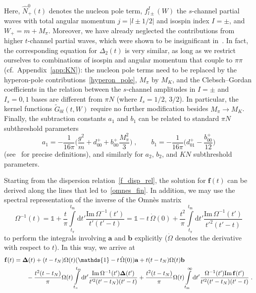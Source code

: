 \documentclass[11pt]{article}%
\providecommand{\ec}{\;,}
\providecommand{\ep}{\;.}
\providecommand{\nt}{\notag}
\newcommand{\diff}{\text{d}}
\newcommand{\mpi}{M_{\pi}}
\newcommand{\mK}{M_K}
\newcommand{\unity}{\mathds{1}}
\newcommand{\tpi}{t_\pi}
\newcommand{\tN}{t_N}
\newcommand{\tm}{t_\text{m}}
\newcommand{\ff}{\mathbf{f}}
\newcommand{\beq}{\begin{equation}}
\newcommand{\eeq}{\end{equation}}
\renewcommand{\Im}{\text{Im}\,}
\providecommand{\unity}{\mathds{1}}
\begin{document}
Here, $\hat N^0_+(t)$ denotes the nucleon pole term, $f^I_{l\pm}(W)$ the $s$-channel partial waves with total angular momentum $j=|l\pm 1/2|$ and isospin index $I=\pm$, and $W_+=m+\mpi$. Moreover, we have already neglected the contributions from higher $t$-channel partial waves, which were shown to be insignificant in~\cite{RS_DHKM}. In fact, the corresponding equation for $\Delta_2(t)$ is very similar, as long as we restrict ourselves to combinations of isospin and angular momentum that couple to $\pi\pi$ (cf.\ Appendix~\ref{app:KN}): the nucleon pole terms need to be replaced by the hyperon-pole contributions~\eqref{hyperon_pole}, $\mpi$ by $\mK$, and the Clebsch--Gordan coefficients in the relation between the $s$-channel amplitudes in $I=\pm$ and $I_s=0,1$ bases are different from $\pi N$ (where $I_s=1/2,\,3/2$). In particular, the kernel functions $\tilde G_{0l}(t,W)$ require no further modification besides $\mpi\to\mK$.    
Finally, the subtraction constants $a_1$ and $b_1$ can be related to standard $\pi N$ subthreshold parameters
\beq
a_1=-\frac{1}{16\pi}\Bigg(\frac{g^2}{m}+d_{00}^++b_{00}^+\frac{\mpi^2}{3}\Bigg)\ec\qquad 
b_1= -\frac{1}{16\pi}\Bigg(d_{01}^+-\frac{b_{00}^+}{12}\Bigg)
\eeq
(see~\cite{RS_DHKM} for precise definitions), and similarly for $a_2$, $b_2$, and $KN$ subthreshold parameters.

Starting from the dispersion relation~\eqref{f_disp_rel}, the solution for $\ff(t)$ can be derived along the lines that led to~\eqref{omnes_fin}. In addition, we may use the spectral representation of the inverse of the Omn\`es matrix
\beq
 \Omega^{-1}(t)=\unity+\frac{t}{\pi}\int\limits_{\tpi}^{\tm}\diff t'\frac{\Im\Omega^{-1}(t')}{t'(t'-t)}
=\unity-t\,\dot\Omega(0)+\frac{t^2}{\pi}\int\limits_{\tpi}^{\tm}\diff t'\frac{\Im\Omega^{-1}(t')}{t'^2(t'-t)}
\eeq
to perform the integrals involving $\mathbf{a}$ and $\mathbf{b}$ explicitly ($\dot\Omega$ denotes the derivative with respect to $t$). In this way, we arrive at
\begin{align}
\label{final_omnes_sol}
\ff(t)&=\boldsymbol{\Delta}(t)+(t-\tN)\Omega(t)(\unity-t\,\dot\Omega(0))\mathbf{a}+t(t-\tN)\Omega(t)\mathbf{b}\nt\\
&\qquad-\frac{t^2(t-\tN)}{\pi}\Omega(t)\int\limits_{\tpi}^{\tm}\diff t'\frac{\Im\Omega^{-1}(t')\boldsymbol{\Delta}(t')}{t'^2(t'-\tN)(t'-t)}
+\frac{t^2(t-\tN)}{\pi}\Omega(t)\int\limits_{\tm}^\infty\diff t'\frac{\Omega^{-1}(t')\Im \ff(t')}{t'^2(t'-\tN)(t'-t)}\ep
\end{align}
\end{document}
